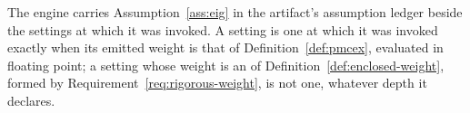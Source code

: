
\begin{requirement}\label{req:eig-ledger-row}
The engine carries Assumption~\ref{ass:eig} in the artifact's assumption
ledger  beside the settings at which it was invoked.
A setting is one at which it was invoked exactly when its emitted weight is
that of Definition~\ref{def:pmcex}, evaluated in floating point; a setting
whose weight is an  of Definition~\ref{def:enclosed-weight},
formed by Requirement~\ref{req:rigorous-weight}, is not one, whatever depth it
declares.
\end{requirement}
